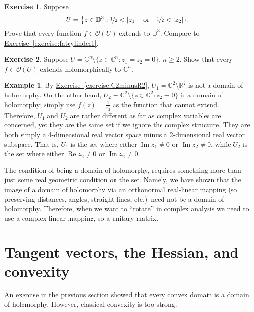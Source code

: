 \documentclass[12pt,openany]{book}
\newcommand{\avoidbreak}{\postdisplaypenalty=100}
\renewcommand{\Re}{\operatorname{Re}}
\renewcommand{\Im}{\operatorname{Im}}
\newcommand{\sabs}[1]{\lvert {#1} \rvert}
\newcommand{\C}{{\mathbb{C}}}
\newcommand{\R}{{\mathbb{R}}}
\newcommand{\D}{{\mathbb{D}}}
\newcommand{\sO}{{\mathscr{O}}}
\theoremstyle{plain}
\theoremstyle{remark}
\theoremstyle{definition}
\newenvironment{exbox}{%
    \def\FrameCommand{\vrule width 1pt \relax\hspace{10pt}}%
    \MakeFramed {\advance \hsize -\width \FrameRestore}%
}{%
    \endMakeFramed
}
\theoremstyle{exercise}
\newtheorem{exercise}{Exercise}[section]
\theoremstyle{example}
\newtheorem{example}[thm]{Example}
\newcommand{\exerciseref}[1]{\hyperref[#1]{Exercise~\ref*{#1}}}
\begin{document}
\begin{exbox}
\begin{exercise} \label{exercise:fatcylinder2}
Suppose 
\begin{equation*}
U = \bigl\{ z \in \D^3 :
\nicefrac{1}{2} < \sabs{z_1} \quad\text{or}\quad
\nicefrac{1}{2} < \sabs{z_2} \bigr\} .
\avoidbreak
\end{equation*}
Prove that every function $f \in \sO(U)$ extends to $\D^3$.
Compare to \exerciseref{exercise:fatcylinder1}.
\end{exercise}

\begin{exercise} \label{exercise:codim2extends}
Suppose $U = \C^n \setminus \{ z \in \C^n : z_1 = z_2 = 0 \}$, $n
\geq 2$.  Show that every $f \in \sO(U)$ extends holomorphically to
$\C^n$.
\end{exercise}
\end{exbox}

\begin{example}
By
\exerciseref{exercise:C2minusR2},
$U_1 = \C^2 \setminus \R^2$
is not a domain of holomorphy.  On the other hand,
$U_2 = \C^2 \setminus \{ z \in \C^2 : z_2 = 0 \}$ is a domain of holomorphy;
simply
use $f(z) = \frac{1}{z_2}$ as the function that cannot extend.
Therefore, $U_1$ and $U_2$ are rather different as far as complex variables are
concerned, yet they are the same set if we ignore the complex structure.
They are both simply a 4-dimensional real vector space minus a 2-dimensional
real vector subspace.  That is, $U_1$ is the set
where either $\Im z_1 \not= 0$ or $\Im z_2 \not= 0$,
while $U_2$ is the set
where either $\Re z_2 \not= 0$ or $\Im z_2 \not= 0$.

The condition of being a domain of holomorphy,
requires something more than just some real geometric condition on the
set.  Namely, we have shown that the image of a domain of holomorphy
via an orthonormal
real-linear mapping 
(so preserving distances, angles, straight lines,
etc.)\ need not be a domain of holomorphy.  Therefore, when we want to
``rotate'' in complex analysis we need to use a complex linear mapping,
so a unitary matrix.
\end{example}


\section{Tangent vectors, the Hessian, and convexity}

An exercise in the previous section showed that every convex domain is a
domain of holomorphy.  However, classical convexity is too strong.
\end{document}
